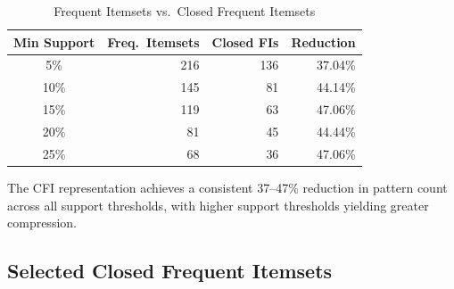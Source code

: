 \documentclass[12pt,a4paper]{article}
\begin{document}
\begin{table}[H]
\centering
\caption{Frequent Itemsets vs.\ Closed Frequent Itemsets}
\label{tab:fi_vs_cfi}
\begin{tabular}{c r r r}
\toprule
\textbf{Min Support} & \textbf{Freq.\ Itemsets} & \textbf{Closed FIs} & \textbf{Reduction} \\
\midrule
5\%  & 216 & 136 & 37.04\% \\
10\% & 145 & 81  & 44.14\% \\
15\% & 119 & 63  & 47.06\% \\
20\% & 81  & 45  & 44.44\% \\
25\% & 68  & 36  & 47.06\% \\
\bottomrule
\end{tabular}
\end{table}

The CFI representation achieves a consistent 37--47\% reduction in pattern count across all support thresholds, with higher support thresholds yielding greater compression.

\subsection{Selected Closed Frequent Itemsets}
\end{document}
